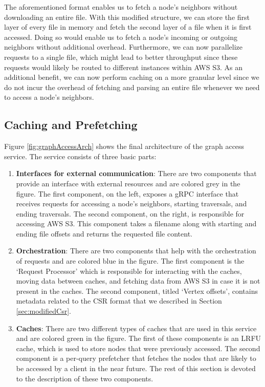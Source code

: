 \medskip
The aforementioned format enables us to fetch a node's neighbors
without downloading an entire file. With this modified structure, we can
store the first layer of every file in memory and fetch the second layer of a
file when it is first accessed. Doing so would enable us to fetch a
node's incoming or outgoing neighbors without additional overhead.
Furthermore, we can now parallelize requests to a single file, which might lead
to better throughput since these requests would likely be routed to
different instances within AWS S3. As an additional benefit, we can now perform
caching on a more granular level since we do not incur the overhead of fetching
and parsing an entire file whenever we need to access a node's neighbors.

\subsection{Caching and Prefetching}\label{sec:accessCachePrefetching}
Figure \ref{fig:graphAccessArch} shows the final architecture of the graph
access service. The service consists of three basic parts:
\begin{enumerate}
    \item \textbf{Interfaces for external communication}: There are two 
        components that provide an interface with external resources and are
        colored grey in the figure. The first component, on the left,
        exposes a gRPC interface that receives requests for accessing a node's
        neighbors, starting traversals, and ending traversals. The second
        component, on the right, is responsible for accessing AWS S3. This component
        takes a filename along with starting and ending file offsets and returns
        the requested file content.
    \item \textbf{Orchestration}: There are two components that help with
        the orchestration of requests and are colored blue in the figure. The first
        component is the `Request Processor' which is responsible for
        interacting with the caches, moving data between caches, and fetching
        data from AWS S3 in case it is not present in the caches. The second
        component, titled `Vertex offsets', contains metadata related to the CSR
        format that we described in Section \ref{sec:modifiedCsr}.
    \item \textbf{Caches}: There are two different types of caches that are used
        in this service and are colored green in the figure. The first of these
        components is an LRFU cache, which is used to store nodes that were
        previously accessed. The second component is a per-query prefetcher
        that fetches the nodes that are likely to be accessed by a client in
        the near future. The rest of this section is devoted to the description
        of these two components.
\end{enumerate}
